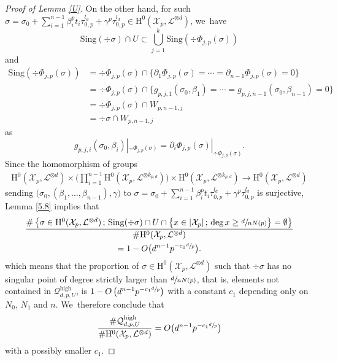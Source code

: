 \documentclass[JEP,XML,SOM,Unicode,published]{cedram}
\newcommand{\sep}{\,;\,}
\theoremstyle{plain}
\theoremstyle{definition}
\newcommand{\ho}{\mathrm{H}}
\newcommand{\X}{\mathcal{X}}
\newcommand{\li}{\mathcal{L}}
\begin{document}
\begin{proof}[Proof of Lemma \ref{U}]
On the other hand, for such $\sigma=\sigma_0+\sum_{i=1}^{n-1} \beta_i^pt_i\tau_{0,p}^{l_d}+\gamma^p\tau_{0,p}^{l_d}\in \ho^0(\X_p,\mathcal{L}^{\otimes d})$, we~have
\[
\mathrm{Sing}(\div \sigma)\cap U \subset \bigcup_{j=1}^k \mathrm{Sing}(\div \Phi_{j,p}(\sigma))
\]
and
\begin{align*}
\mathrm{Sing}(\div \Phi_{j,p}(\sigma))
&= \div \Phi_{j,p}(\sigma)\cap \{ \partial_1\Phi_{j,p}(\sigma)=\cdots =\partial_{n-1}\Phi_{j,p}(\sigma)=0 \} \\
&= \div \Phi_{j,p}(\sigma)\cap \{ g_{p,j,1}(\sigma_0,\beta_1)=\cdots = g_{p,j,n-1}(\sigma_0,\beta_{n-1})=0 \} \\
&= \div \Phi_{j,p}(\sigma)\cap W_{p,n-1,j} \\
&= \div \sigma\cap W_{p,n-1,j}
\end{align*}
as
\[
g_{p,j,i}(\sigma_0,\beta_i)|_{ \div \Phi_{j,p}(\sigma)}=\partial_i\Phi_{j,p}(\sigma)|_{ \div \Phi_{j,p}(\sigma)}.
\]
Since the homomorphism of groups
\begin{align*}
\ho^0(\X_p,\mathcal{L}^{\otimes d})\times \biggl(\prod_{i=1}^{n-1} \ho^0(\X_p,\mathcal{L}^{\otimes k_{p,d}}) \biggr) \times \ho^0(\X_p, \mathcal{L}^{\otimes k_{p,d}}) \to \ho^0(\X_p, \mathcal{L}^{\otimes d})
\end{align*}
sending $\big(\sigma_0, (\beta_1,\dots, \beta_{n-1}), \gamma\big)$ to $\sigma=\sigma_0+\sum_{i=1}^{n-1} \beta_i^pt_i\tau_{0,p}^{l_d}+\gamma^p\tau_{0,p}^{l_d}$ is surjective, Lemma \ref{5.8} implies that
\begin{multline*}
\frac{\#\left\{\sigma\in \ho^0(\X_p, \mathcal{L}^{\otimes d})\sep \mathrm{Sing}(\div \sigma)\cap U\cap \big\{ x\in |\X_p|\sep \deg x\geq\sfrac{d}{nN(p)} \big\}=\emptyset \right\}}{\# \ho^0(\X_p, \mathcal{L}^{\otimes d})}\\
= 1-O\bigl(d^{n-1}p^{-c_1\sfrac{d}{p}} \bigr).
\end{multline*}
which means that the proportion of $\sigma\in \ho^0(\X_p, \li^{\otimes d})$ such that $\div \sigma$ has no singular point of degree strictly larger than $\sfrac{d}{nN(p)}$, that is, elements not contained in $\mathcal{Q}_{d,p,U}^{\mathrm{high}}$, is $1-O\left(d^{n-1}p^{-c_1\sfrac{d}{p}} \right)$ with a constant $c_1$ depending only on $N_0$, $N_1$ and $n$. We~therefore conclude that
\[
\frac{\#\mathcal{Q}_{d,p,U}^{\mathrm{high}}}{\#\ho^0(\X_p, \li^{\otimes d})}=O\bigl(d^{n-1}p^{-c_1\sfrac{d}{p}}\bigr)
\]
with a possibly smaller $c_1$. 


\end{proof}
\end{document}
